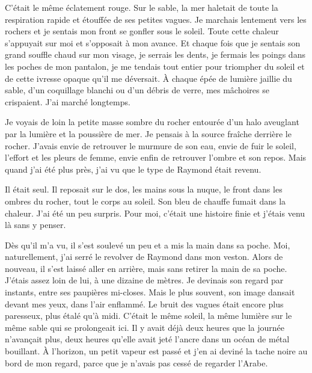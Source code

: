 \documentclass[french,twoside]{book} %
\begin{document}
C'était le même éclatement rouge. Sur le sable, la mer haletait de toute la respiration rapide et étouffée de ses petites vagues. Je marchais lentement vers les rochers et je sentais mon front se gonfler sous le soleil. Toute cette chaleur s’appuyait sur moi et s’opposait à mon avance. Et chaque fois que je sentais son grand souffle chaud sur mon visage, je serrais les dents, je fermais les poings dans les poches de mon pantalon, je me tendais tout entier pour triompher du soleil et de cette ivresse opaque qu’il me déversait. À chaque épée de lumière jaillie du sable, d’un coquillage blanchi ou d’un débris de verre, mes mâchoires se crispaient. J'ai marché longtemps.\par
Je voyais de loin la petite masse sombre du rocher entourée d’un halo aveuglant par la lumière et la poussière de mer. Je pensais à la source fraîche derrière le rocher. J'avais envie de retrouver le murmure de son eau, envie de fuir le soleil, l’effort et les pleurs de femme, envie enfin de retrouver l’ombre et son repos. Mais quand j’ai été plus près, j’ai vu que le type de Raymond était revenu.\par
Il était seul. Il reposait sur le dos, les mains sous la nuque, le front dans les ombres du rocher, tout le corps au soleil. Son bleu de chauffe fumait dans la chaleur. J'ai été un peu surpris. Pour moi, c’était une histoire finie et j’étais venu là sans y penser.\par
Dès qu’il m’a vu, il s’est soulevé un peu et a mis la main dans sa poche. Moi, naturellement, j’ai serré le revolver de Raymond dans mon veston. Alors de nouveau, il s’est laissé aller en arrière, mais sans retirer la main de sa poche. J'étais assez loin de lui, à une dizaine de mètres. Je devinais son regard par instants, entre ses paupières mi-closes. Mais le plus souvent, son image dansait devant mes yeux, dans l’air enflammé. Le bruit des vagues était encore plus paresseux, plus étalé qu’à midi. C'était le même soleil, la même lumière sur le même sable qui se prolongeait ici. Il y avait déjà deux heures que la journée n’avançait plus, deux heures qu’elle avait jeté l’ancre dans un océan de métal bouillant. À l’horizon, un petit vapeur est passé et j’en ai deviné la tache noire au bord de mon regard, parce que je n’avais pas cessé de regarder l’Arabe.\par
\end{document}
